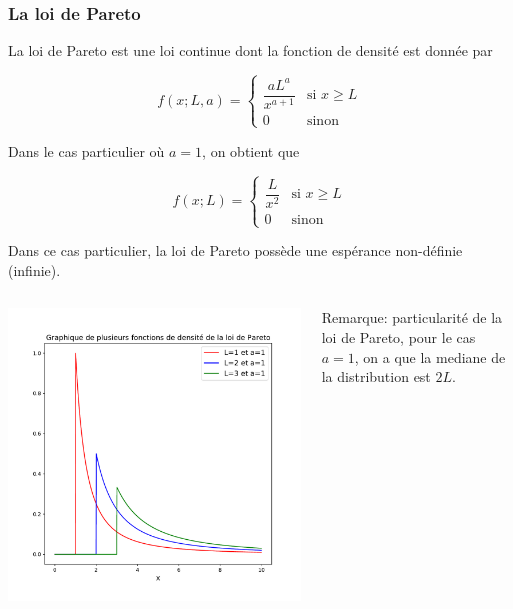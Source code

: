 \documentclass[8pt, sans]{beamer}
\begin{document}
\begin{frame}
\frametitle{La loi de Pareto}
La loi de Pareto est une loi continue dont la fonction de densité est donnée par

$$f(x;L,a)=\left\{
\begin{array}{ll}
\dfrac{aL^a}{x^{a+1}} & \text{si $x\geq L$}\\
0                       & \text{sinon}
\end{array}
\right.
$$

\pause

Dans le cas particulier où $a=1$, on obtient que 

$$f(x;L)=\left\{
\begin{array}{ll}
\dfrac{L}{x^{2}} & \text{si $x\geq L$}\\
0                       & \text{sinon}
\end{array}
\right.
$$

\pause

Dans ce cas particulier, la loi de Pareto possède une espérance non-définie (infinie).

\begin{columns}[T]

\begin{column}{0.5\linewidth}

\includegraphics[scale=0.25]{graphiques_Pareto.pdf}

\end{column}

\hfill
\pause
\begin{column}{0.5\linewidth}

\vspace*{2cm}
Remarque: particularité de la loi de Pareto, pour le cas $a=1$, on a que la mediane de la distribution est $2L.$

\end{column}

\end{columns}

\end{frame}
\end{document}
